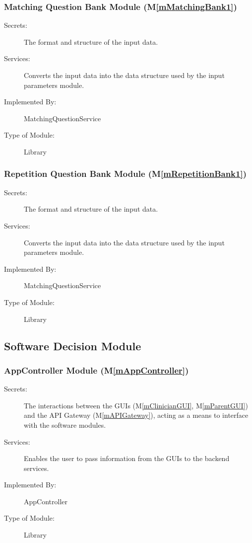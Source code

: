 \documentclass[12pt, titlepage]{article}
\newcommand{\mref}[1]{M\ref{#1}}
\begin{document}
\subsubsection{Matching Question Bank Module (\mref{mMatchingBank1})}

\begin{description}
\item[Secrets:]The format and structure of the input data.
\item[Services:]Converts the input data into the data structure used by the
  input parameters module.
\item[Implemented By:] MatchingQuestionService
\item[Type of Module:] Library
\end{description}

\subsubsection{Repetition Question Bank Module (\mref{mRepetitionBank1})}

\begin{description}
\item[Secrets:]The format and structure of the input data.
\item[Services:]Converts the input data into the data structure used by the
  input parameters module.
\item[Implemented By:] MatchingQuestionService
\item[Type of Module:] Library
\end{description}

\subsection{Software Decision Module}

  \subsubsection{AppController Module (\mref{mAppController})}
  
  \begin{description}
    \item[Secrets:]The interactions between the GUIs (\mref{mClinicianGUI}, \mref{mParentGUI}) and the API Gateway (\mref{mAPIGateway}), acting as a means to interface with the software modules.
    \item[Services:]Enables the user to pass information from the GUIs to the backend services.
    \item[Implemented By:] AppController
    \item[Type of Module:] Library
    \end{description}
  
\end{document}
